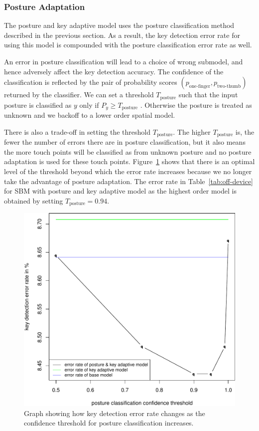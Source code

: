 \documentclass{sigchi}
\begin{document}
\subsubsection{Posture Adaptation}\label{sec:off-device-posture}
The posture and key adaptive model uses the posture classification
method described in the previous section. As a result, the
key detection error rate for using this model is compounded with the posture
classification error rate as well. 

An error in posture classification will lead to a choice of wrong submodel,
and hence adversely affect the key detection accuracy. The confidence of the classification is reflected by the pair of probability 
scores $(p_{\text{one-finger}}, p_{\text{two-thumb}})$ returned by the classifier. 
We can set a threshold $T_{\text{posture}}$ such that the input posture is classified
as $y$ only if $P_y \ge T_{\text{posture}}$ . Otherwise the posture is treated as
unknown and we backoff to a lower order spatial model.

There is also a trade-off in setting the threshold $T_{\text{posture}}$. The higher
 $T_{\text{posture}}$ is, the fewer the number of errors there are in posture classification, but it also means the more touch points will be classified as from unknown posture and no posture adaptation is used for these touch points. Figure~\ref{fig:posture-confidence} 
 shows that there is an optimal level of the threshold beyond which the error rate
 increases because we no longer take the advantage of posture adaptation. The error rate in Table~\ref{tab:off-device} for SBM with posture and key adaptive model as the highest order model is obtained by setting $T_{\text{posture}} = 0.94$.

\begin{figure}[tb]
 \includegraphics[width=0.9\columnwidth]{figures/error-confidence-cropped.pdf}
  \caption{Graph showing how key detection error rate changes as the confidence
  threshold for posture classification increases.}
  \label{fig:posture-confidence}
\end{figure}
\end{document}
